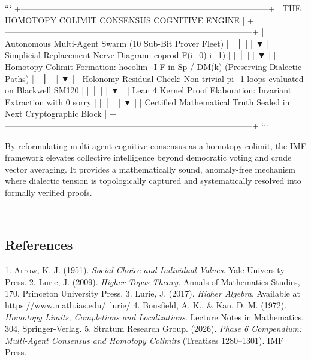 \documentclass[11pt,twoside,openright]{amsbook}
\begin{document}
```
+-----------------------------------------------------------------------------------------+
|                  THE HOMOTOPY COLIMIT CONSENSUS COGNITIVE ENGINE                       |
+-----------------------------------------------------------------------------------------+
|  Autonomous Multi-Agent Swarm (10 Sub-Bit Prover Fleet)                                 |
|         │                                                                               |
|         ▼                                                                               |
|  Simplicial Replacement Nerve Diagram: coprod F(i_0)  i_1)           |
|         │                                                                               |
|         ▼                                                                               |
|  Homotopy Colimit Formation: hocolim_{I} F in Sp / DM(k) (Preserving Dialectic Paths)   |
|         │                                                                               |
|         ▼                                                                               |
|  Holonomy Residual Check: Non-trivial pi_1 loops evaluated on Blackwell SM120           |
|         │                                                                               |
|         ▼                                                                               |
|  Lean 4 Kernel Proof Elaboration: Invariant Extraction with 0 sorry                     |
|         │                                                                               |
|         ▼                                                                               |
|  Certified Mathematical Truth Sealed in Next Cryptographic Block                        |
+-----------------------------------------------------------------------------------------+
```

By reformulating multi-agent cognitive consensus as a homotopy colimit, the IMF framework elevates collective intelligence beyond democratic voting and crude vector averaging. It provides a mathematically sound, anomaly-free mechanism where dialectic tension is topologically captured and systematically resolved into formally verified proofs.

---

\subsection{References}
1. Arrow, K. J. (1951). \textit{Social Choice and Individual Values}. Yale University Press.
2. Lurie, J. (2009). \textit{Higher Topos Theory}. Annals of Mathematics Studies, 170, Princeton University Press.
3. Lurie, J. (2017). \textit{Higher Algebra}. Available at https://www.math.ias.edu/~lurie/
4. Bousfield, A. K., & Kan, D. M. (1972). \textit{Homotopy Limits, Completions and Localizations}. Lecture Notes in Mathematics, 304, Springer-Verlag.
5. Stratum Research Group. (2026). \textit{Phase 6 Compendium: Multi-Agent Consensus and Homotopy Colimits} (Treatises 1280–1301). IMF Press.
\end{document}
